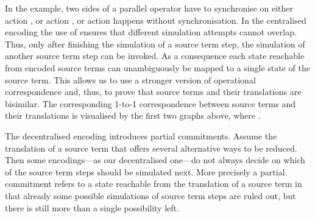 \documentclass[copyright,creativecommons]{eptcs}
\begin{document}
  \begin{minipage}[c]{0.4\textwidth-2pt}
  \end{minipage}

  In the example, two sides of a parallel operator have to synchronise on either action , or action , or action  happens without synchronisation.
  In the centralised encoding  the use of  ensures that different simulation attempts cannot overlap. Thus, only after finishing the simulation of a source term step, the simulation of another source term step can be invoked. As a consequence each state reachable from encoded source terms can unambiguously be mapped to a single state of the source term. This allows us to use a stronger version of operational correspondence and, thus, to prove that source terms and their translations are bisimilar. The corresponding 1-to-1 correspondence between source terms and their translations is visualised by the first two graphs above, where .

  The decentralised encoding  introduces partial commitments.
  Assume the translation of a source term that offers several alternative ways to be reduced. Then some encodings---as our decentralised one---do not always decide on which of the source term steps should be simulated next. More precisely a partial commitment refers to a state reachable from the translation of a source term in that already some possible simulations of source term steps are ruled out, but there is still more than a single possibility left.
  
\end{document}
